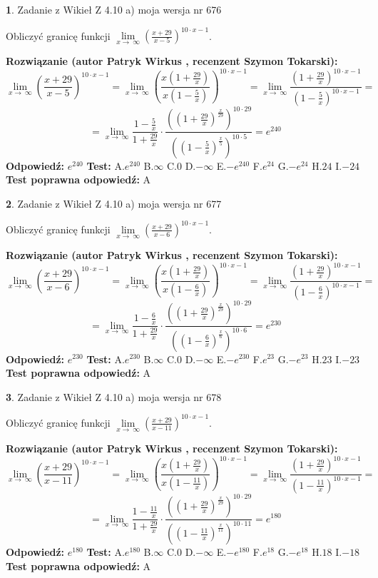 \documentclass[12pt, a4paper]{article}
\theoremstyle{definition} %
\newtheorem{zad}{}
\newcommand{\zadStart}[1]{\begin{zad}#1\newline}
\newcommand{\zadStop}{\end{zad}}
\newcommand{\rozwStart}[2]{\noindent \textbf{Rozwiązanie (autor #1 , recenzent #2): }\newline}
\newcommand{\rozwStop}{\newline}
\newcommand{\odpStart}{\noindent \textbf{Odpowiedź:}\newline}
\newcommand{\odpStop}{\newline}
\newcommand{\testStart}{\noindent \textbf{Test:}\newline}
\newcommand{\testStop}{\newline}
\newcommand{\kluczStart}{\noindent \textbf{Test poprawna odpowiedź:}\newline}
\newcommand{\kluczStop}{\newline}
\begin{document}
\zadStart{Zadanie z Wikieł Z 4.10 a) moja wersja nr 676}

Obliczyć granicę funkcji  $\lim\limits_{x\to\ \infty}(\frac{x+29}{x-5})^{10\cdot x-1}$.
\zadStop
\rozwStart{Patryk Wirkus}{Szymon Tokarski}
$$\lim\limits_{x\to\ \infty}(\frac{x+29}{x-5})^{10\cdot x-1} = \lim\limits_{x\to\ \infty}(\frac{x(1+\frac{29}{x})}{x(1-\frac{5}{x})})^{10\cdot x-1}=\lim\limits_{x\to\ \infty}\frac{(1+\frac{29}{x})^{10\cdot x-1}}{(1-\frac{5}{x})^{10\cdot x-1}}=$$
$$=\lim\limits_{x\to\ \infty}\frac{1-\frac{5}{x}}{1+\frac{29}{x}}\cdot\frac{((1+\frac{29}{x})^{\frac{x}{29}})^{10\cdot29}}{((1-\frac{5}{x})^{\frac{x}{5}})^{10\cdot5}}=e^{240}$$
\rozwStop
\odpStart
$e^{240}$
\odpStop
\testStart
A.$e^{240}$ B.$\infty$ C.$0$ D.$-\infty$ E.$-e^{240}$
F.$e^{24}$ G.$-e^{24}$
H.$24$
I.$-24$
\testStop
\kluczStart
A
\kluczStop



\zadStart{Zadanie z Wikieł Z 4.10 a) moja wersja nr 677}

Obliczyć granicę funkcji  $\lim\limits_{x\to\ \infty}(\frac{x+29}{x-6})^{10\cdot x-1}$.
\zadStop
\rozwStart{Patryk Wirkus}{Szymon Tokarski}
$$\lim\limits_{x\to\ \infty}(\frac{x+29}{x-6})^{10\cdot x-1} = \lim\limits_{x\to\ \infty}(\frac{x(1+\frac{29}{x})}{x(1-\frac{6}{x})})^{10\cdot x-1}=\lim\limits_{x\to\ \infty}\frac{(1+\frac{29}{x})^{10\cdot x-1}}{(1-\frac{6}{x})^{10\cdot x-1}}=$$
$$=\lim\limits_{x\to\ \infty}\frac{1-\frac{6}{x}}{1+\frac{29}{x}}\cdot\frac{((1+\frac{29}{x})^{\frac{x}{29}})^{10\cdot29}}{((1-\frac{6}{x})^{\frac{x}{6}})^{10\cdot6}}=e^{230}$$
\rozwStop
\odpStart
$e^{230}$
\odpStop
\testStart
A.$e^{230}$ B.$\infty$ C.$0$ D.$-\infty$ E.$-e^{230}$
F.$e^{23}$ G.$-e^{23}$
H.$23$
I.$-23$
\testStop
\kluczStart
A
\kluczStop



\zadStart{Zadanie z Wikieł Z 4.10 a) moja wersja nr 678}

Obliczyć granicę funkcji  $\lim\limits_{x\to\ \infty}(\frac{x+29}{x-11})^{10\cdot x-1}$.
\zadStop
\rozwStart{Patryk Wirkus}{Szymon Tokarski}
$$\lim\limits_{x\to\ \infty}(\frac{x+29}{x-11})^{10\cdot x-1} = \lim\limits_{x\to\ \infty}(\frac{x(1+\frac{29}{x})}{x(1-\frac{11}{x})})^{10\cdot x-1}=\lim\limits_{x\to\ \infty}\frac{(1+\frac{29}{x})^{10\cdot x-1}}{(1-\frac{11}{x})^{10\cdot x-1}}=$$
$$=\lim\limits_{x\to\ \infty}\frac{1-\frac{11}{x}}{1+\frac{29}{x}}\cdot\frac{((1+\frac{29}{x})^{\frac{x}{29}})^{10\cdot29}}{((1-\frac{11}{x})^{\frac{x}{11}})^{10\cdot11}}=e^{180}$$
\rozwStop
\odpStart
$e^{180}$
\odpStop
\testStart
A.$e^{180}$ B.$\infty$ C.$0$ D.$-\infty$ E.$-e^{180}$
F.$e^{18}$ G.$-e^{18}$
H.$18$
I.$-18$
\testStop
\kluczStart
A
\kluczStop
\end{document}
